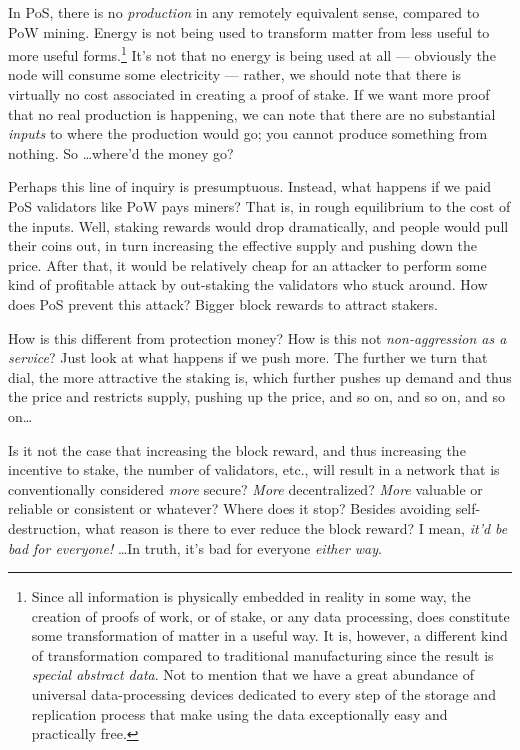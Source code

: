 In PoS, there is no \emph{production} in any remotely equivalent sense, compared to PoW mining.
Energy is not being used to transform matter from less useful to more useful forms.\footnote{
  Since all information is physically embedded in reality in some way, the creation of proofs of work, or of stake, or any data processing, does constitute some transformation of matter in a useful way.
  It is, however, a different kind of transformation compared to traditional manufacturing since the result is \emph{special abstract data}.
  Not to mention that we have a great abundance of universal data-processing devices dedicated to every step of the storage and replication process that make using the data exceptionally easy and practically free.
}
It's not that no energy is being used at all --- obviously the node will consume some electricity --- rather, we should note that there is virtually no cost associated in creating a proof of stake.
If we want more proof that no real production is happening, we can note that there are no substantial \emph{inputs} to where the production would go; you cannot produce something from nothing.
So \ldots where'd the money go?

Perhaps this line of inquiry is presumptuous.
Instead, what happens if we paid PoS validators like PoW pays miners?
That is, in rough equilibrium to the cost of the inputs.
Well, staking rewards would drop dramatically, and people would pull their coins out, in turn increasing the effective supply and pushing down the price.
After that, it would be relatively cheap for an attacker to perform some kind of profitable attack by out-staking the validators who stuck around.
How does PoS prevent this attack?
Bigger block rewards to attract stakers.

How is this different from protection money?
How is this not \emph{non-aggression as a service}?
Just look at what happens if we push more.
The further we turn that dial, the more attractive the staking is, which further pushes up demand and thus the price and restricts supply, pushing up the price, and so on, and so on, and so on\ldots

Is it not the case that increasing the block reward, and thus increasing the incentive to stake, the number of validators, etc., will result in a network that is conventionally considered \emph{more} secure?
\emph{More} decentralized?
\emph{More} valuable or reliable or consistent or whatever?
Where does it stop?
Besides avoiding self-destruction, what reason is there to ever reduce the block reward?
I mean, \emph{it'd be bad for everyone!}
\ldots In truth, it's bad for everyone \emph{either way}.

